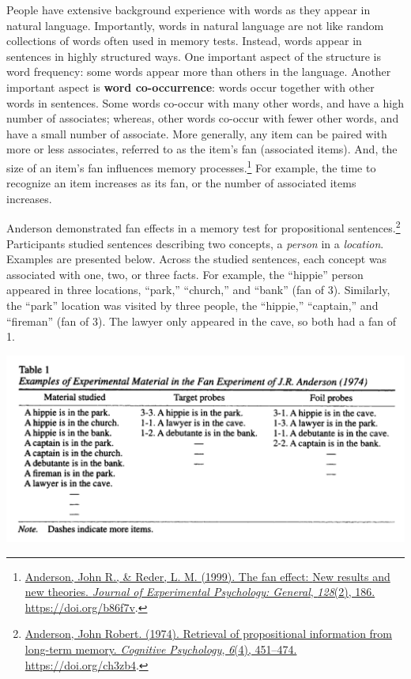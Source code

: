 \documentclass[
  oneside,
  12pt]{crumpbook}
\begin{document}
People have extensive background experience with words as they appear in natural language. Importantly, words in natural language are not like random collections of words often used in memory tests. Instead, words appear in sentences in highly structured ways. One important aspect of the structure is word frequency: some words appear more than others in the language. Another important aspect is \textbf{word co-occurrence}: words occur together with other words in sentences. Some words co-occur with many other words, and have a high number of associates; whereas, other words co-occur with fewer other words, and have a small number of associate. More generally, any item can be paired with more or less associates, referred to as the item's fan (associated items). And, the size of an item's fan influences memory processes.\footnote{\protect\hyperlink{ref-andersonFanEffectNew1999}{Anderson, John R., \& Reder, L. M. (1999). The fan effect: {New} results and new theories. \emph{Journal of Experimental Psychology: General}, \emph{128}(2), 186. \url{https://doi.org/b86f7v}}.} For example, the time to recognize an item increases as its fan, or the number of associated items increases.

Anderson demonstrated fan effects in a memory test for propositional sentences.\footnote{\protect\hyperlink{ref-andersonRetrievalPropositionalInformation1974}{Anderson, John Robert. (1974). Retrieval of propositional information from long-term memory. \emph{Cognitive Psychology}, \emph{6}(4), 451--474. \url{https://doi.org/ch3zb4}}.} Participants studied sentences describing two concepts, a \emph{person} in a \emph{location}. Examples are presented below. Across the studied sentences, each concept was associated with one, two, or three facts. For example, the ``hippie'' person appeared in three locations, ``park,'' ``church,'' and ``bank'' (fan of 3). Similarly, the ``park'' location was visited by three people, the ``hippie,'' ``captain,'' and ``fireman'' (fan of 3). The lawyer only appeared in the cave, so both had a fan of 1.

\begin{center}\includegraphics[width=1\linewidth]{imgs/Fan_effect} \end{center}
\end{document}
